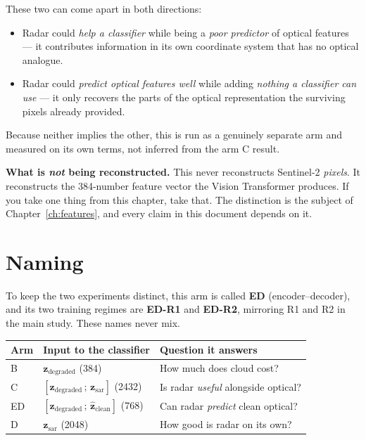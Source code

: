\documentclass[11pt,a4paper]{report}
\newcommand{\zd}{\mathbf{z}_{\text{degraded}}}
\newcommand{\zs}{\mathbf{z}_{\text{sar}}}
\newcommand{\zh}{\hat{\mathbf{z}}_{\text{clean}}}
\begin{document}
These two can come apart in both directions:

\begin{itemize}
\item Radar could \emph{help a classifier} while being a \emph{poor predictor}
      of optical features --- it contributes information in its own coordinate
      system that has no optical analogue.
\item Radar could \emph{predict optical features well} while adding
      \emph{nothing a classifier can use} --- it only recovers the parts of the
      optical representation the surviving pixels already provided.
\end{itemize}

Because neither implies the other, this is run as a genuinely separate arm and
measured on its own terms, not inferred from the arm C result.

\begin{flagbox}
\textbf{What is \emph{not} being reconstructed.} This never reconstructs
Sentinel-2 \emph{pixels}. It reconstructs the 384-number feature vector the
Vision Transformer produces. If you take one thing from this chapter, take that.
The distinction is the subject of Chapter~\ref{ch:features}, and every claim in
this document depends on it.
\end{flagbox}

\section{Naming}

To keep the two experiments distinct, this arm is called \textbf{ED}
(encoder--decoder), and its two training regimes are \textbf{ED-R1} and
\textbf{ED-R2}, mirroring R1 and R2 in the main study. These names never mix.

\begin{center}
\small
\begin{tabular}{@{}llp{7.6cm}@{}}
\toprule
\textbf{Arm} & \textbf{Input to the classifier} & \textbf{Question it answers} \\
\midrule
B  & $\zd$ (384) & How much does cloud cost? \\
C  & $[\zd\,;\,\zs]$ (2432) & Is radar \emph{useful} alongside optical? \\
ED & $[\zd\,;\,\zh]$ (768) & Can radar \emph{predict} clean optical? \\
D  & $\zs$ (2048) & How good is radar on its own? \\
\bottomrule
\end{tabular}
\end{center}
\end{document}
